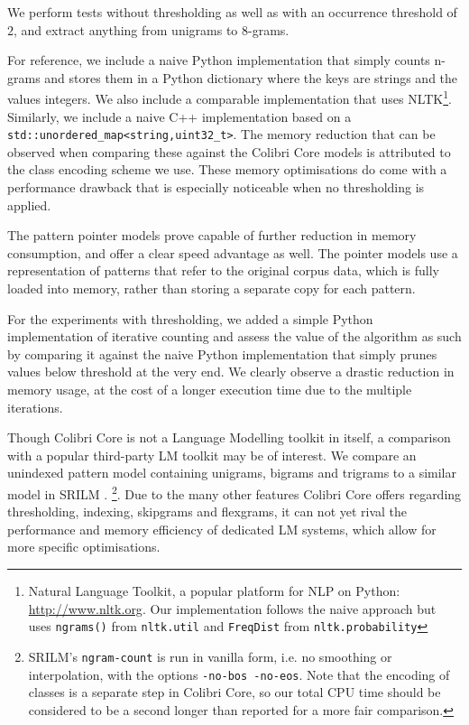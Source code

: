 We perform tests without thresholding as well as with an occurrence threshold
of $2$, and extract anything from unigrams to $8$-grams.

For reference, we include a naive Python implementation that simply counts
n-grams and stores them in a Python dictionary where the keys are strings and
the values integers. We also include a comparable implementation that uses
NLTK\footnote{Natural Language Toolkit, a popular platform for NLP on Python:
    \url{http://www.nltk.org}. Our implementation follows the naive approach
    but uses \texttt{ngrams()} from \texttt{nltk.util} and \texttt{FreqDist} from
\texttt{nltk.probability}}. Similarly, we include a naive C++ implementation based on
a \verb|std::unordered_map<string,uint32_t>|. The memory reduction that can be
observed when comparing these against the Colibri Core models is attributed to
the class encoding scheme we use. These memory optimisations do come with a
performance drawback that is especially noticeable when no thresholding is
applied.

The pattern pointer models prove capable of further reduction in memory
consumption, and offer a clear speed advantage as well. The pointer models use a
representation of patterns that refer to the original corpus data, which is
fully loaded into memory, rather than storing a separate copy for each pattern.

For the experiments with thresholding, we added a simple Python implementation of
iterative counting and assess the value of the algorithm as such by comparing
it against the naive Python implementation that simply prunes values below
threshold at the very end. We clearly observe a drastic reduction in memory
usage, at the cost of a longer execution time due to the multiple iterations.

Though Colibri Core is not a Language Modelling toolkit in itself, a comparison
with a popular third-party LM toolkit may be of interest. We compare an
unindexed pattern model containing unigrams, bigrams and trigrams to a similar
model in SRILM \cite{SRILM}. \footnote{SRILM's \texttt{ngram-count} is run in
vanilla form, i.e. no smoothing or interpolation, with the options
\texttt{-no-bos -no-eos}. Note that the encoding of classes is a separate step in
Colibri Core, so our total CPU time should be considered to be a second longer
than reported for a more fair comparison.}. Due to the many other features
Colibri Core offers regarding thresholding, indexing, skipgrams and flexgrams, it
can not yet rival the performance and memory efficiency of dedicated LM systems,
which allow for more specific optimisations.

